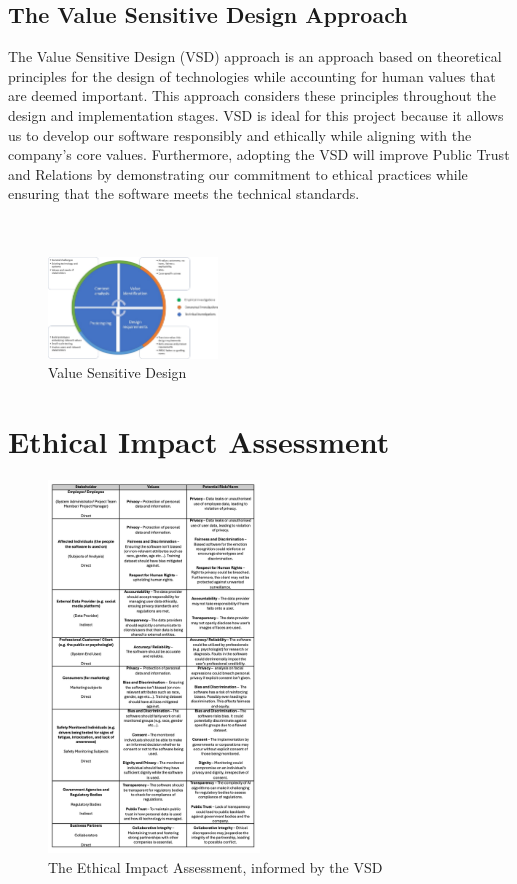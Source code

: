 \documentclass[10pt,journal,compsoc]{IEEEtran}
\begin{document}
\subsection{The Value Sensitive Design Approach}
The Value Sensitive Design (VSD) approach is an approach based on theoretical principles for the design of technologies while accounting for human values that are deemed important\cite{Friedman2009Value}\cite{BiasAndVSD}. This approach considers these principles throughout the design and implementation stages. VSD is ideal for this project because it allows us to develop our software responsibly and ethically while aligning with the company’s core values. Furthermore, adopting the VSD will improve Public Trust and Relations by demonstrating our commitment to ethical practices while ensuring that the software meets the technical standards.
\\ \\ \\
\begin{figure}[ht!]
    \centering
    \includegraphics[width=0.4\textwidth]{coursework/figs/43681_2021_38_Fig6_HTML.png}
    \caption{Value Sensitive Design}
    \label{fig:enter-label1}
\end{figure}


\newpage

\section{Ethical Impact Assessment}
\begin{figure}[ht!]
    \centering
    \includegraphics[width=0.5\textwidth]{coursework/figs/Table2_ss.png}
    \caption{The Ethical Impact Assessment, informed by the VSD}
    \label{fig:enter-label}
\end{figure}
\end{document}
